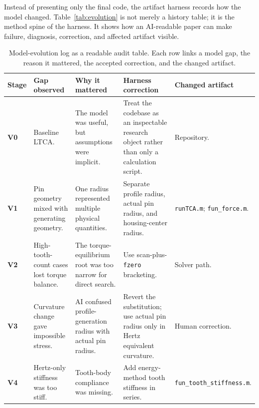 \documentclass{article}
\begin{document}
Instead of presenting only the final code, the artifact harness records how the model changed. Table~\ref{tab:evolution} is not merely a history table; it is the method spine of the harness. It shows how an AI-readable paper can make failure, diagnosis, correction, and affected artifact visible.

\begin{table}[t]
\caption{Model-evolution log as a readable audit table. Each row links a model gap, the reason it mattered, the accepted correction, and the changed artifact.}
\centering
\begingroup
\small
\renewcommand{\arraystretch}{1.18}
\setlength{\tabcolsep}{4pt}
\newcommand{\stagebadge}[1]{\colorbox{blue!8}{\textcolor{blue!65!black}{\strut\textbf{#1}}}}
\begin{tabular}{>{\raggedright\arraybackslash}p{1.15cm}
                >{\raggedright\arraybackslash}p{2.75cm}
                >{\raggedright\arraybackslash}p{3.15cm}
                >{\raggedright\arraybackslash}p{4.15cm}
                >{\raggedright\arraybackslash}p{2.15cm}}
\toprule
\textbf{Stage} & \textbf{Gap observed} & \textbf{Why it mattered} & \textbf{Harness correction} & \textbf{Changed artifact} \\
\midrule
\stagebadge{V0} & Baseline LTCA. & The model was useful, but assumptions were implicit. & Treat the codebase as an inspectable research object rather than only a calculation script. & Repository. \\
\addlinespace[2pt]
\stagebadge{V1} & Pin geometry mixed with generating geometry. & One radius represented multiple physical quantities. & Separate profile radius, actual pin radius, and housing-center radius. & \texttt{runTCA.m}; \texttt{fun\_force.m}. \\
\addlinespace[2pt]
\stagebadge{V2} & High-tooth-count cases lost torque balance. & The torque-equilibrium root was too narrow for direct search. & Use scan-plus-\texttt{fzero} bracketing. & Solver path. \\
\addlinespace[2pt]
\stagebadge{V3} & Curvature change gave impossible stress. & AI confused profile-generation radius with actual pin radius. & Revert the substitution; use actual pin radius only in Hertz equivalent curvature. & Human correction. \\
\addlinespace[2pt]
\stagebadge{V4} & Hertz-only stiffness was too stiff. & Tooth-body compliance was missing. & Add energy-method tooth stiffness in series. & \texttt{fun\_tooth\_}\newline\texttt{stiffness.m}. \\

\end{tabular}
\end{table}
\end{document}
